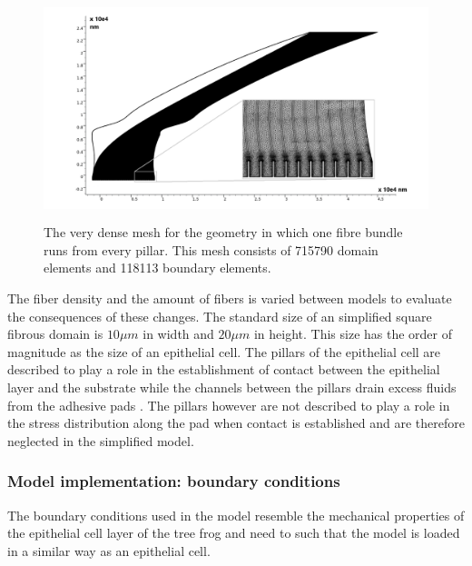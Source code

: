 \begin{figure}[h!] 
    \includegraphics[width=0.85\linewidth, height=6.5cm, angle=0]{images/discrete_model_implementation/mesh_compleet.png}
    \caption{The very dense mesh for the geometry in which one fibre bundle runs from every pillar. This mesh consists of 715790 domain elements and 118113 boundary elements.}
    \label{fig:mesh}
\end{figure}

\qquad The fiber density and the amount of fibers is varied between models to evaluate the consequences of these changes. The standard size of an simplified square fibrous domain is $10\mu m$ in width and $20 \mu m$ in height. This size has the order of magnitude as the size of an epithelial cell. The pillars of the epithelial cell are described to play a role in the establishment of contact between the epithelial layer and the substrate while the channels between the pillars drain excess fluids from the adhesive pads \cite{kappl2016nanoscale}. The pillars however are not described to play a role in the stress distribution along the pad when contact is established and are therefore neglected in the simplified model.


\subsubsection{Model implementation: boundary conditions}\label{sec:discrete_model_boundary_con}
The boundary conditions used in the model resemble the mechanical properties of the epithelial cell layer of the tree frog and need to such that the model is loaded in a similar way as an epithelial cell.\\ 

